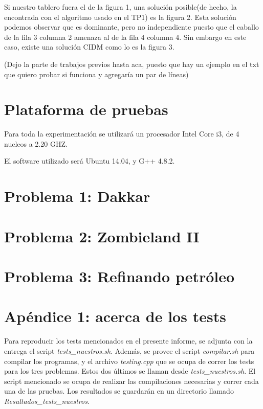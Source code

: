\documentclass[a4paper]{article}
\begin{document}
Si nuestro tablero fuera el de la figura 1, una solución posible(de hecho, la encontrada con el algoritmo usado en el TP1) es la figura 2. Esta solución podemos observar que es dominante, pero no independiente puesto que el caballo de la fila 3 columna 2 amenaza al de la fila 4 columna 4. Sin embargo en este caso, existe una solución CIDM como lo es la figura 3. 

(Dejo la parte de trabajos previos hasta aca, puesto que hay un ejemplo en el txt que quiero probar si funciona y agregaría un par de líneas)


\section{Plataforma de pruebas}

Para toda la experimentación se utilizará un procesador Intel Core i3, de 4 nucleos a 2.20 GHZ.

El software utilizado será Ubuntu 14.04, y G++ 4.8.2.
\newpage
\section{Problema 1: Dakkar}


\newpage
\section{Problema 2: Zombieland II}


\newpage
\section{Problema 3: Refinando petróleo}



\newpage
\section{Apéndice 1: acerca de los tests}
Para reproducir los tests mencionados en el presente informe, se adjunta con la entrega el script {\it tests_nuestros.sh}.  Además, se provee el script {\it compilar.sh} para compilar los programas, y el archivo {\it testing.cpp} que se ocupa de correr los tests para los tres problemas.  Estos dos últimos se llaman desde {\it tests_nuestros.sh}.
El script mencionado se ocupa de realizar las compilaciones necesarias y correr cada una de las pruebas. Los resultados se guardarán en un directorio llamado {\it Resultados_tests_nuestros}.
\end{document}
